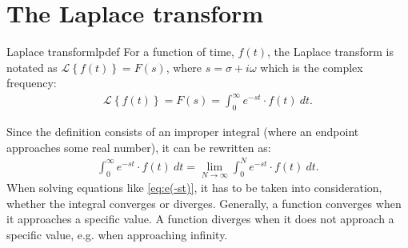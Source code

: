 \section{The Laplace transform}
\begin{definition}{Laplace transform}{lpdef}
For a function of time, $f(t)$, the Laplace transform is notated as $\mathcal{L}\left\{ f(t)\right\} = F(s)$, where $s = \sigma + i\omega$ which is the complex frequency:
\begin{align}
\mathcal{L} \left\{f(t) \right\}=F(s)=\int_{0}^{\infty} e^{-st}\cdot f(t)\ dt.
\end{align}
\end{definition}
\noindent Since the definition consists of an improper integral (where an endpoint approaches some real number), it can be rewritten as:
\begin{align}
\int_{0}^{\infty} e^{-st}\cdot f(t)\ dt = \lim_{N \to \infty} \int_{0}^{N} e^{-st}\cdot f(t)\ dt. \label{eq:e(-st)}
\end{align}
When solving equations like \eqref{eq:e(-st)}, it has to be taken into consideration, whether the integral converges or diverges. Generally, a function converges when it approaches a specific value. A function diverges when it does not approach a specific value, e.g. when approaching infinity.

